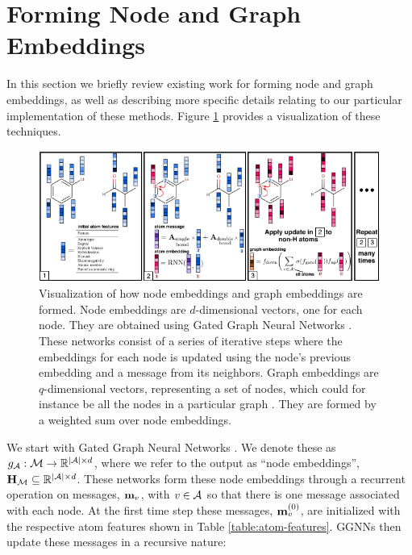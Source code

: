\section{Forming Node and Graph Embeddings}

In this section we briefly review existing work for forming node and graph embeddings, as well as describing more specific details relating to our particular implementation of these methods. 
Figure \ref{fig:graph_nn} provides a visualization of these techniques.

\begin{figure}
\centering
\includegraphics[width=\textwidth]{imgs/graph_nn}
\caption{
Visualization of how node embeddings and graph embeddings are formed. 
Node embeddings are $d$-dimensional vectors, one for each node. 
They are obtained using Gated Graph Neural Networks \citep{li2016gated}.
These networks consist of a series of iterative steps where the embeddings for each node is updated using the node's previous embedding and a message from its neighbors.
 Graph embeddings are $q$-dimensional vectors, representing a set of nodes, which could for instance be all the nodes in a particular graph \citep{li2018learning}.
  They are formed by a weighted sum over node embeddings.
}
\label{fig:graph_nn}
\end{figure}

 We start with Gated Graph Neural Networks \citep{li2016gated, gilmer2017neural}. 
 We denote these as $g_{{\mathcal{A}}}: {\mathcal{M}} \to \mathbb{R}^{|{\mathcal{A}}|\times d}$, where we refer to the output as ``node embeddings'', ${\mathbf{H}}_{{\mathcal{M}}} \subseteq \mathbb{R}^{|{\mathcal{A}}|\times d}$. 
These networks form these node embeddings through a recurrent operation on messages, ${\mathbf{m}}_v$, with $v \in {\mathcal{A}}$ so that there is one message associated with each node.
At the first time step these messages, ${\mathbf{m}}_v^{(0)}$, are initialized with the respective atom features shown in Table \ref{table:atom-features}. GGNNs then update these messages in a recursive nature:

